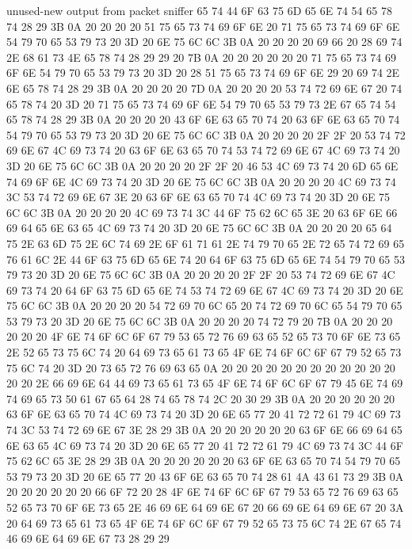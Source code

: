 \begin{chunk}{unused-new output from packet sniffer}
65 74 44 6F 63 75 6D 65 6E 74 54 65 78 74 28 29 3B 0A 20 20 20 20 51 75 65 
73 74 69 6F 6E 20 71 75 65 73 74 69 6F 6E 54 79 70 65 53 79 73 20 3D 20 6E 
75 6C 6C 3B 0A 20 20 20 20 69 66 20 28 69 74 2E 68 61 73 4E 65 78 74 28 29 
29 20 7B 0A 20 20 20 20 20 20 71 75 65 73 74 69 6F 6E 54 79 70 65 53 79 73 
20 3D 20 28 51 75 65 73 74 69 6F 6E 29 20 69 74 2E 6E 65 78 74 28 29 3B 0A 
20 20 20 20 7D 0A 20 20 20 20 53 74 72 69 6E 67 20 74 65 78 74 20 3D 20 71 
75 65 73 74 69 6F 6E 54 79 70 65 53 79 73 2E 67 65 74 54 65 78 74 28 29 3B 
0A 20 20 20 20 43 6F 6E 63 65 70 74 20 63 6F 6E 63 65 70 74 54 79 70 65 53 
79 73 20 3D 20 6E 75 6C 6C 3B 0A 20 20 20 20 2F 2F 20 53 74 72 69 6E 67 4C 
69 73 74 20 63 6F 6E 63 65 70 74 53 74 72 69 6E 67 4C 69 73 74 20 3D 20 6E 
75 6C 6C 3B 0A 20 20 20 20 2F 2F 20 46 53 4C 69 73 74 20 6D 65 6E 74 69 6F 
6E 4C 69 73 74 20 3D 20 6E 75 6C 6C 3B 0A 20 20 20 20 4C 69 73 74 3C 53 74 
72 69 6E 67 3E 20 63 6F 6E 63 65 70 74 4C 69 73 74 20 3D 20 6E 75 6C 6C 3B 
0A 20 20 20 20 4C 69 73 74 3C 44 6F 75 62 6C 65 3E 20 63 6F 6E 66 69 64 65 
6E 63 65 4C 69 73 74 20 3D 20 6E 75 6C 6C 3B 0A 20 20 20 20 65 64 75 2E 63 
6D 75 2E 6C 74 69 2E 6F 61 71 61 2E 74 79 70 65 2E 72 65 74 72 69 65 76 61 
6C 2E 44 6F 63 75 6D 65 6E 74 20 64 6F 63 75 6D 65 6E 74 54 79 70 65 53 79 
73 20 3D 20 6E 75 6C 6C 3B 0A 20 20 20 20 2F 2F 20 53 74 72 69 6E 67 4C 69 
73 74 20 64 6F 63 75 6D 65 6E 74 53 74 72 69 6E 67 4C 69 73 74 20 3D 20 6E 
75 6C 6C 3B 0A 20 20 20 20 54 72 69 70 6C 65 20 74 72 69 70 6C 65 54 79 70 
65 53 79 73 20 3D 20 6E 75 6C 6C 3B 0A 20 20 20 20 74 72 79 20 7B 0A 20 20 
20 20 20 20 4F 6E 74 6F 6C 6F 67 79 53 65 72 76 69 63 65 52 65 73 70 6F 6E 
73 65 2E 52 65 73 75 6C 74 20 64 69 73 65 61 73 65 4F 6E 74 6F 6C 6F 67 79 
52 65 73 75 6C 74 20 3D 20 73 65 72 76 69 63 65 0A 20 20 20 20 20 20 20 20 
20 20 20 20 20 20 2E 66 69 6E 64 44 69 73 65 61 73 65 4F 6E 74 6F 6C 6F 67 
79 45 6E 74 69 74 69 65 73 50 61 67 65 64 28 74 65 78 74 2C 20 30 29 3B 0A 
20 20 20 20 20 20 63 6F 6E 63 65 70 74 4C 69 73 74 20 3D 20 6E 65 77 20 41 
72 72 61 79 4C 69 73 74 3C 53 74 72 69 6E 67 3E 28 29 3B 0A 20 20 20 20 20 
20 63 6F 6E 66 69 64 65 6E 63 65 4C 69 73 74 20 3D 20 6E 65 77 20 41 72 72 
61 79 4C 69 73 74 3C 44 6F 75 62 6C 65 3E 28 29 3B 0A 20 20 20 20 20 20 63 
6F 6E 63 65 70 74 54 79 70 65 53 79 73 20 3D 20 6E 65 77 20 43 6F 6E 63 65 
70 74 28 61 4A 43 61 73 29 3B 0A 20 20 20 20 20 20 66 6F 72 20 28 4F 6E 74 
6F 6C 6F 67 79 53 65 72 76 69 63 65 52 65 73 70 6F 6E 73 65 2E 46 69 6E 64 
69 6E 67 20 66 69 6E 64 69 6E 67 20 3A 20 64 69 73 65 61 73 65 4F 6E 74 6F 
6C 6F 67 79 52 65 73 75 6C 74 2E 67 65 74 46 69 6E 64 69 6E 67 73 28 29 29 

\end{chunk}
